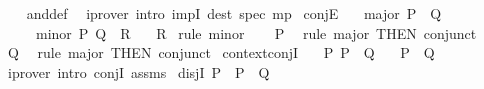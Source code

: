 \begin{isabellebody}
%
\isadelimproof
\ \ %
\endisadelimproof
%
\isatagproof
{}\isamarkupfalse%
\ and{\isacharunderscore}{\kern0pt}def\ \isamarkupfalse%
\ {\isacharparenleft}{\kern0pt}iprover\ intro{\isacharcolon}{\kern0pt}\ impI\ dest{\isacharcolon}{\kern0pt}\ spec\ mp{\isacharparenright}{\kern0pt}%
\endisatagproof
{\isafoldproof}%
%
\isadelimproof
\isanewline
%
\endisadelimproof
\isanewline
{}\isamarkupfalse%
\ conjE{\isacharcolon}{\kern0pt}\isanewline
\ \ \ major{\isacharcolon}{\kern0pt}\ {\isachardoublequoteopen}P\ {\isasymand}\ Q{\isachardoublequoteclose}\isanewline
\ \ \ \ \ minor{\isacharcolon}{\kern0pt}\ {\isachardoublequoteopen}{\isasymlbrakk}P{\isacharsemicolon}{\kern0pt}\ Q{\isasymrbrakk}\ {\isasymLongrightarrow}\ R{\isachardoublequoteclose}\isanewline
\ \ \ R\isanewline
%
\isadelimproof
%
\endisadelimproof
%
\isatagproof
{}\isamarkupfalse%
\ {\isacharparenleft}{\kern0pt}rule\ minor{\isacharparenright}{\kern0pt}\isanewline
\ \ \isamarkupfalse%
\ P\ \isamarkupfalse%
\ {\isacharparenleft}{\kern0pt}rule\ major\ {\isacharbrackleft}{\kern0pt}THEN\ conjunct{}{\isacharbrackright}{\kern0pt}{\isacharparenright}{\kern0pt}\isanewline
\ \ \isamarkupfalse%
\ Q\ \isamarkupfalse%
\ {\isacharparenleft}{\kern0pt}rule\ major\ {\isacharbrackleft}{\kern0pt}THEN\ conjunct{}{\isacharbrackright}{\kern0pt}{\isacharparenright}{\kern0pt}\isanewline
{}\isamarkupfalse%
%
\endisatagproof
{\isafoldproof}%
%
\isadelimproof
\isanewline
%
\endisadelimproof
\isanewline
{}\isamarkupfalse%
\ context{\isacharunderscore}{\kern0pt}conjI{\isacharcolon}{\kern0pt}\isanewline
\ \ \ P\ {\isachardoublequoteopen}P\ {\isasymLongrightarrow}\ Q{\isachardoublequoteclose}\isanewline
\ \ \ {\isachardoublequoteopen}P\ {\isasymand}\ Q{\isachardoublequoteclose}\isanewline
%
\isadelimproof
\ \ %
\endisadelimproof
%
\isatagproof
{}\isamarkupfalse%
\ {\isacharparenleft}{\kern0pt}iprover\ intro{\isacharcolon}{\kern0pt}\ conjI\ assms{\isacharparenright}{\kern0pt}%
\endisatagproof
{\isafoldproof}%
%
\isadelimproof
%
\endisadelimproof
%
\isadelimdocument
%
\endisadelimdocument
%
\isatagdocument
%
\isamarkuptrue%
%
\endisatagdocument
{\isafolddocument}%
%
\isadelimdocument
%
\endisadelimdocument
{}\isamarkupfalse%
\ disjI{}{\isacharcolon}{\kern0pt}\ {\isachardoublequoteopen}P\ {\isasymLongrightarrow}\ P\ {\isasymor}\ Q{\isachardoublequoteclose}\isanewline

\end{isabellebody}
